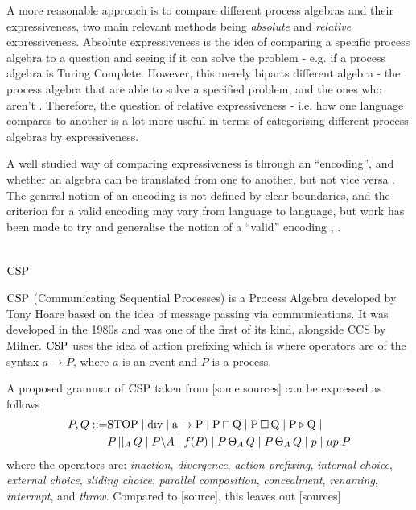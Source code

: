 \documentclass[../hons_project.tex]{subfiles}
\begin{document}
A more reasonable approach is to compare different process algebras and their expressiveness, two main relevant methods being \textit{absolute} and \textit{relative} expressiveness.\citep{parrowExpressivenessProcessAlgebras2008} Absolute expressiveness is the idea of comparing a specific process algebra to a question and seeing if it can solve the problem - e.g. if a process algebra is Turing Complete. However, this merely biparts different algebra - the process algebra that are able to solve a specified problem, and the ones who aren't \citep{gorlaUnifiedApproachEncodability2010}. Therefore, the question of relative expressiveness - i.e. how one language compares to another is a lot more useful in terms of categorising different process algebras by expressiveness.

A well studied way of comparing expressiveness is through an ``encoding'', and whether an algebra can be translated from one to another, but not vice versa \citep{petersComparingProcessCalculi2019}. The general notion of an encoding is not defined by clear boundaries, and the criterion for a valid encoding may vary from language to language, but work has been made to try and generalise the notion of a ``valid'' encoding \citep{gorlaUnifiedApproachEncodability2010}, \citep{DBLP:conf/fossacs/Glabbeek18}.

\section{\texorpdfstring{$\mathrm{CSP}$}{CSP}}
$\mathrm{CSP}$ (Communicating Sequential Processes) \citep{brookesTheoryCommunicatingSequential1984} is a Process Algebra developed by Tony Hoare based on the idea of message passing via communications. It was developed in the 1980s and was one of the first of its kind, alongside CCS by Milner. $\mathrm{CSP}$ uses the idea of action prefixing which is where operators are of the syntax $a \to P$, where $a$ is an event and $P$ is a process. 

A proposed grammar of $\mathrm{CSP}$ taken from [some sources] can be expressed as follows
\begin{align*}
   P, Q ::= &\mathrm{STOP} \mid \rm{div} \mid a\to P \mid P \sqcap Q \mid P \,\square\, Q \mid P \triangleright Q \mid \\
	&P \,\vert\vert_{A}\, Q \mid P \backslash A \mid f(P) \mid P \,\Theta_{A}\, Q \mid P \,\Theta_{A}\, Q \mid p \mid \mu p.P
\end{align*}
where the operators are: \textit{inaction}, \textit{divergence}, \textit{action prefixing}, \textit{internal choice}, \textit{external choice}, \textit{sliding choice}, \textit{parallel composition}, \textit{concealment}, \textit{renaming}, \textit{interrupt}, and \textit{throw}. Compared to [source], this leaves out [sources]
\end{document}
